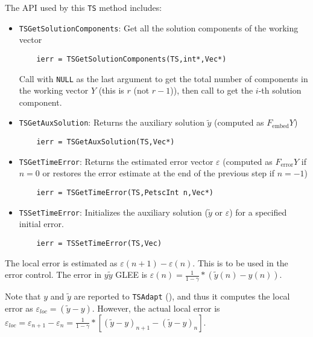 The API used by this \lstinline{TS} method includes:
\begin{itemize}
  \item \lstinline{TSGetSolutionComponents}: Get all the solution components of the working vector
    \begin{lstlisting}
    ierr = TSGetSolutionComponents(TS,int*,Vec*)
    \end{lstlisting}
    Call with \lstinline{NULL} as the last argument to get the total number of
    components in the working vector $Y$ (this is $r$ (not $r-1$)),
    then call to get the $i$-th solution component. 
  \item \lstinline{TSGetAuxSolution}: Returns the auxiliary solution $\tilde{y}$ (computed as $F_\text{embed} Y$)
    \begin{lstlisting}
    ierr = TSGetAuxSolution(TS,Vec*)
    \end{lstlisting}
  \item \lstinline{TSGetTimeError}: Returns the estimated error vector $\varepsilon$
(computed as $F_\text{error} Y$ if $n=0$ or restores the error estimate at
    the end of the previous step if $n=-1$)
    \begin{lstlisting}
    ierr = TSGetTimeError(TS,PetscInt n,Vec*)
    \end{lstlisting}
  \item \lstinline{TSSetTimeError}: Initializes the auxiliary solution ($\tilde{y}$
or $\varepsilon$) for a specified initial error. 
    \begin{lstlisting}
    ierr = TSSetTimeError(TS,Vec)
    \end{lstlisting}
\end{itemize}

The local error is estimated as $\varepsilon(n+1)-\varepsilon(n)$.
This is to be used in the error control. The error in $y\tilde{y}$
GLEE is $\varepsilon(n) = \frac{1}{1-\gamma} * (\tilde{y}(n) - y(n))$. 

Note that $y$ and $\tilde{y}$ are reported to \lstinline{TSAdapt}  (), and thus it
computes the local error as $\varepsilon_{loc} = (\tilde{y} -
y)$. However, the actual local error is  $\varepsilon_{loc}
= \varepsilon_{n+1} - \varepsilon_n = \frac{1}{1-\gamma} * [(\tilde{y} -
y)_{n+1} - (\tilde{y} - y)_n]$. 

